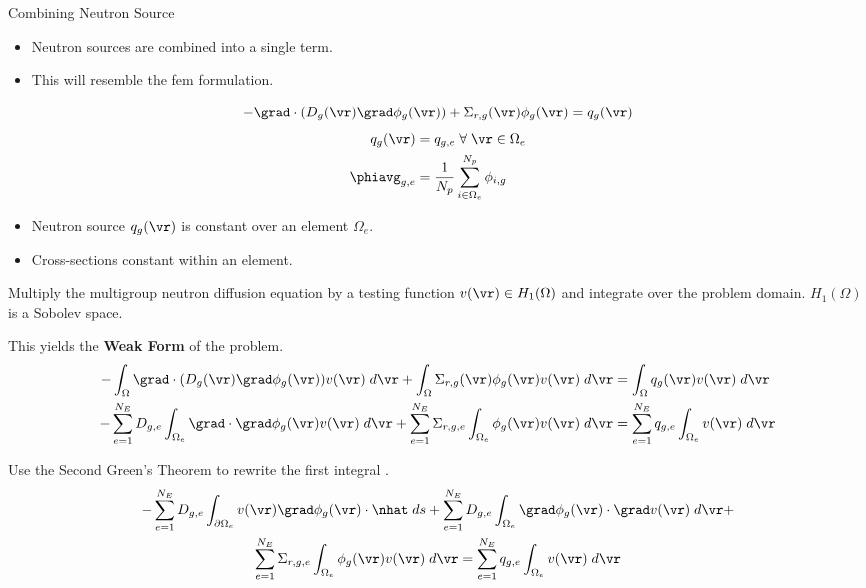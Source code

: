 \begin{frame}{Combining Neutron Source}
  \begin{itemize}
    \item Neutron sources are combined into a single term.
    \item This will resemble the \gls{fem} formulation.
  \end{itemize}
  \begin{equation}
    \label{eq:multigroup_source}
    - \grad \cdot( D_g(\vr) \grad \phi_g(\vr)) + \Sigma_{r,g}(\vr) \phi_g(\vr) = 
      q_g(\vr)
  \end{equation}
  \begin{align}
    q_g(\vr) &= q_{g,e} \; \forall \; \vr \in \Omega_e \\
    \phiavg_{g,e} &= \frac{1}{N_p} \sum_{i \in \Omega_e}^{N_p} \phi_{i,g}
  \end{align}

  \begin{itemize}
    \item Neutron source $q_g(\vr)$ is constant over an element $\Omega_e$.
    \item Cross-sections constant within an element.
  \end{itemize}
\end{frame}

\begin{frame}{}
  Multiply the multigroup neutron diffusion equation by a testing function
  $v(\vr) \in H_1(\Omega)$ and integrate over the problem domain. $H_1(\Omega)$
  is a Sobolev space.
  
  \vspace{0.25in}
  This yields the \textbf{Weak Form} of the problem.
  \begin{align}
    \label{eq:fem_weak_form}
    - \int_{\Omega} \grad \cdot (D_g(\vr) \grad \phi_g(\vr)) v(\vr) \; d\vr
      + \int_{\Omega} \Sigma_{r,g}(\vr) \phi_g(\vr) v(\vr) \;d\vr &=
      \int_{\Omega} q_g(\vr) v(\vr) \;d\vr \\
    \label{eq:element_by_element}
    -\sum_{e=1}^{N_E} D_{g,e} 
      \int_{\Omega_e} \grad \cdot \grad \phi_g(\vr) v(\vr) \; d\vr +
      \sum_{e=1}^{N_E} \Sigma_{r,g,e} \int_{\Omega_e} \phi_g(\vr) v(\vr) 
      \;d\vr &= \sum_{e=1}^{N_E} q_{g,e} \int_{\Omega_e} v(\vr) 
      \; d\vr
  \end{align}
\end{frame}

\begin{frame}
  Use the Second Green's Theorem to rewrite the first integral
  \cite{textbookli}.
  \begin{multline} 
    -\sum_{e=1}^{N_E} D_{g,e} \int_{\partial \Omega_e} v(\vr) \grad
    \phi_g(\vr) \cdot \nhat \;ds + \sum_{e=1}^{N_E} 
      D_{g,e} \int_{\Omega_e} \grad \phi_g(\vr) \cdot \grad v(\vr) 
      \; d\vr + \\
      \sum_{e=1}^{N_E} \Sigma_{r,g,e} \int_{\Omega_e} \phi_g(\vr) v(\vr) 
     \; d\vr =
      \sum_{e=1}^{N_E} q_{g,e} \int_{\Omega_e} v(\vr) \; d\vr
  \end{multline}
\end{frame}

